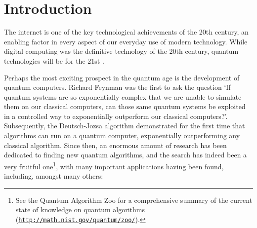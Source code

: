 %
%

\section{Introduction} \label{sec:introduction}

The internet is one of the key technological achievements of the 20th century, an enabling factor in every aspect of our everyday use of modern technology. While digital computing was the definitive technology of the 20th century, quantum technologies will be for the 21st \cite{bib:NielsenChuang00, bib:Bennett00}. 

Perhaps the most exciting prospect in the quantum age is the development of quantum computers. Richard Feynman \cite{bib:Feynman85} was the first to ask the question `If quantum systems are so exponentially complex that we are unable to simulate them on our classical computers, can those same quantum systems be exploited in a controlled way to exponentially outperform our classical computers?'. Subsequently, the Deutsch-Jozsa algorithm \cite{bib:DeutschJozsa92} demonstrated for the first time that algorithms can run on a quantum computer, exponentially outperforming any classical algorithm. Since then, an enormous amount of research has been dedicated to finding new quantum algorithms, and the search has indeed been a very fruitful one\footnote{See the Quantum Algorithm Zoo for a comprehensive summary of the current state of knowledge on quantum algorithms (\texttt{\href{http://math.nist.gov/quantum/zoo/}{http://math.nist.gov/quantum/zoo/}}).}, with many important applications having been found, including, amongst many others:

